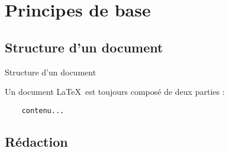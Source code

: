 
\section{Principes de base}

\subsection{Structure d'un document}

\begin{frame}[fragile]{Structure d'un document}

	Un document \LaTeX\ est toujours composé de deux parties :
	
\begin{lstlisting}
	contenu...
\end{lstlisting}
\end{frame}

\subsection{Rédaction}